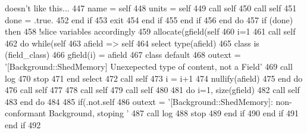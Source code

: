 \begin{DoxyCode}
{       doesn't like this...}
447                         name = self%
448                         units = self%
449                         \textcolor{keyword}{call }self%
450                         \textcolor{keyword}{call }self%
451                         done  = .true.
452 \textcolor{keywordflow}{                    end if}
453                     \textcolor{keywordflow}{exit}
454 \textcolor{keywordflow}{                end if}
455 \textcolor{keywordflow}{            end if}
456 \textcolor{keywordflow}{        end do}
457         \textcolor{keywordflow}{if} (done) \textcolor{keywordflow}{then}
458             \textcolor{comment}{!slice variables accordingly}
459             \textcolor{keyword}{allocate}(gfield(self%
460             i=1
461             \textcolor{keyword}{call }self%
462             \textcolor{keywordflow}{do} \textcolor{keywordflow}{while}(self%
463                 afield => self%
464                 \textcolor{keywordflow}{select type}(afield)
465 \textcolor{keywordflow}{                class is} (field\_class)
466                     gfield(i) = afield%
467 \textcolor{keywordflow}{                    class default}
468                     outext = \textcolor{stringliteral}{'[Background::ShedMemory] Unexepected type of content, not a Field'}
469                     \textcolor{keyword}{call }log%
470                     stop
471 \textcolor{keywordflow}{                end select}
472                 \textcolor{keyword}{call }self%
473                 i = i+1
474                 \textcolor{keyword}{nullify}(afield)
475 \textcolor{keywordflow}{            end do}
476             \textcolor{keyword}{call }self%
477 
478             \textcolor{keyword}{call }self%
479             \textcolor{keyword}{call }self%
480 
481             \textcolor{keywordflow}{do} i=1, \textcolor{keyword}{size}(gfield)
482                 \textcolor{keyword}{call }self%
483 \textcolor{keywordflow}{            end do}
484 
485             \textcolor{keywordflow}{if}(.not.self%
486                 outext = \textcolor{stringliteral}{'[Background::ShedMemory]: non-conformant Background, stoping '}
487                 \textcolor{keyword}{call }log%
488                 stop
489 \textcolor{keywordflow}{            end if}
490 \textcolor{keywordflow}{        end if}
491 \textcolor{keywordflow}{    end if}
492 
\end{DoxyCode}
\mbox{\label{namespacebackground__mod_a3cee95b9b5d3aae83df33334981f2b27}} 
